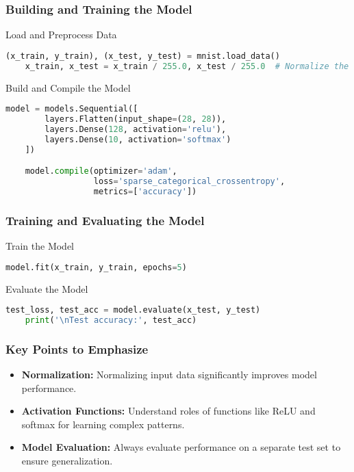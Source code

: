 \documentclass[aspectratio=169]{beamer}
\begin{document}
\begin{frame}[fragile]
    \frametitle{Building and Training the Model}
    \begin{block}{Load and Preprocess Data}
    \begin{lstlisting}[language=Python]
    (x_train, y_train), (x_test, y_test) = mnist.load_data()
    x_train, x_test = x_train / 255.0, x_test / 255.0  # Normalize the pixel values
    \end{lstlisting}
    \end{block}

    \begin{block}{Build and Compile the Model}
    \begin{lstlisting}[language=Python]
    model = models.Sequential([
        layers.Flatten(input_shape=(28, 28)),
        layers.Dense(128, activation='relu'),
        layers.Dense(10, activation='softmax')
    ])

    model.compile(optimizer='adam',
                  loss='sparse_categorical_crossentropy',
                  metrics=['accuracy'])
    \end{lstlisting}
    \end{block}
\end{frame}

\begin{frame}[fragile]
    \frametitle{Training and Evaluating the Model}
    \begin{block}{Train the Model}
    \begin{lstlisting}[language=Python]
    model.fit(x_train, y_train, epochs=5)
    \end{lstlisting}
    \end{block}

    \begin{block}{Evaluate the Model}
    \begin{lstlisting}[language=Python]
    test_loss, test_acc = model.evaluate(x_test, y_test)
    print('\nTest accuracy:', test_acc)
    \end{lstlisting}
    \end{block}
\end{frame}

\begin{frame}[fragile]
    \frametitle{Key Points to Emphasize}
    \begin{itemize}
        \item \textbf{Normalization:} Normalizing input data significantly improves model performance.
        \item \textbf{Activation Functions:} Understand roles of functions like ReLU and softmax for learning complex patterns.
        \item \textbf{Model Evaluation:} Always evaluate performance on a separate test set to ensure generalization.
    \end{itemize}
\end{frame}
\end{document}
